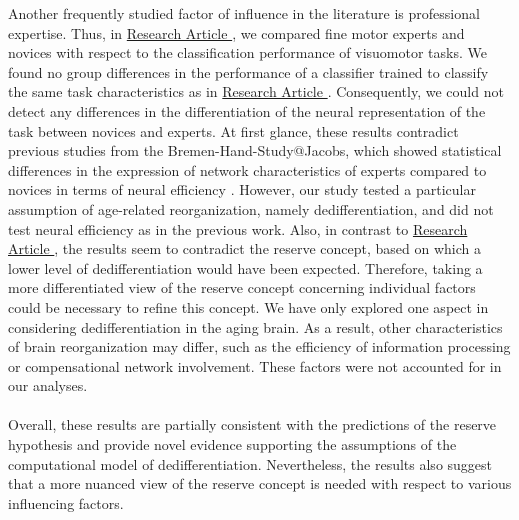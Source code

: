 Another frequently studied factor of influence in the literature is professional expertise. Thus, in \hyperref[results:paperIV]{Research Article }, we compared fine motor experts and novices with respect to the classification performance of visuomotor tasks. We found no group differences in the performance of a classifier trained to classify the same task characteristics as in \hyperref[results:paperI]{Research Article }. Consequently, we could not detect any differences in the differentiation of the neural representation of the task between novices and experts. At first glance, these results contradict previous studies from the Bremen-Hand-Study@Jacobs, which showed statistical differences in the expression of network characteristics of experts compared to novices in terms of neural efficiency \cite{Goelz2018, Vieluf2018}. However, our study tested a particular assumption of age-related reorganization, namely dedifferentiation, and did not test neural efficiency as in the previous work. Also, in contrast to \hyperref[results:paperIII]{Research Article }, the results seem to contradict the reserve concept, based on which a lower level of dedifferentiation would have been expected. Therefore, taking a more differentiated view of the reserve concept concerning individual factors could be necessary to refine this concept. We have only explored one aspect in considering dedifferentiation in the aging brain. As a result, other characteristics of brain reorganization may differ, such as the efficiency of information processing or compensational network involvement. These factors were not accounted for in our analyses.\\
\\
Overall, these results are partially consistent with the predictions of the reserve hypothesis and provide novel evidence supporting the assumptions of the computational model of dedifferentiation. Nevertheless, the results also suggest that a more nuanced view of the reserve concept is needed with respect to various influencing factors.

